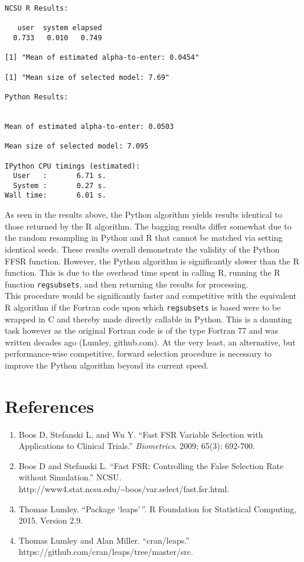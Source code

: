 \documentclass{article}
\begin{document}
    \begin{Verbatim}[commandchars=\\\{\}]
NCSU R Results:

   user  system elapsed 
  0.733   0.010   0.749 

[1] "Mean of estimated alpha-to-enter: 0.0454"

[1] "Mean size of selected model: 7.69"

Python Results:


Mean of estimated alpha-to-enter: 0.0503

Mean size of selected model: 7.095

IPython CPU timings (estimated):
  User   :       6.71 s.
  System :       0.27 s.
Wall time:       6.01 s.
    \end{Verbatim}

    As seen in the results above, the Python algorithm yields results
identical to those returned by the R algorithm. The bagging results
differ somewhat due to the random resampling in Python and R that cannot
be matched via setting identical seeds. These results overall
demonstrate the validity of the Python FFSR function. However, the
Python algorithm is significantly slower than the R function. This is
due to the overhead time spent in calling R, running the R function
\texttt{regsubsets}, and then returning the results for
processing.\\This procedure would be significantly faster and
competitive with the equivalent R algorithm if the Fortran code upon
which \texttt{regsubsets} is based were to be wrapped in C and thereby
made directly callable in Python. This is a daunting task however as the
original Fortran code is of the type Fortran 77 and was written decades
ago (Lumley, github.com). At the very least, an alternative, but
performance-wise competitive, forward selection procedure is necessary
to improve the Python algorithm beyond its current speed.

    \section{References}\label{references}

\begin{enumerate}
\def\labelenumi{\arabic{enumi}.}
\itemsep1pt\parskip0pt
\item
  Boos D, Stefanski L, and Wu Y. ``Fast FSR Variable Selection with
  Applications to Clinical Trials.'' \emph{Biometrics}. 2009; 65(3):
  692-700.
\item
  Boos D and Stefanski L. ``Fast FSR: Controlling the False Selection
  Rate without Simulation.'' NCSU.
  http://www4.stat.ncsu.edu/\textasciitilde{}boos/var.select/fast.fsr.html.
\item
  Thomas Lumley. ``Package `leaps'\,''. R Foundation for Statistical
  Computing, 2015. Version 2.9.
\item
  Thomas Lumley and Alan Miller. ``cran/leaps.''
  https://github.com/cran/leaps/tree/master/src.
\end{enumerate}


    
    
    
    
\end{document}
